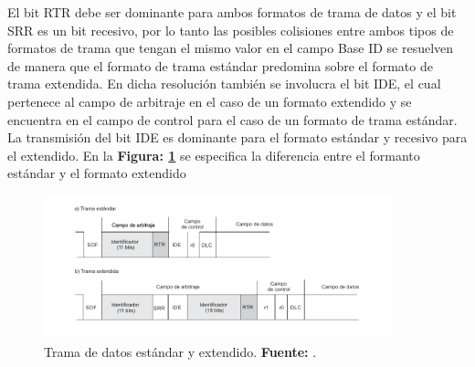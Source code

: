 \begin{itemize}
\begin{itemize}
El bit RTR debe ser dominante para ambos formatos de trama de datos y el bit SRR es un bit recesivo, por lo tanto las posibles colisiones entre ambos tipos de formatos de trama que tengan el mismo valor en el campo Base ID se resuelven de manera que el formato de trama estándar predomina sobre el formato de trama extendida. En dicha resolución también se involucra el bit IDE, el cual pertenece al campo de arbitraje en el caso de un formato extendido y se encuentra en el campo de control para el caso de un formato de trama estándar. La transmisión del bit IDE es dominante para el formato estándar y recesivo para el extendido. En la \textbf{Figura: \ref{FEE}} se especifica la diferencia entre el formanto estándar y el formato extendido

			\begin{figure}[H]
			\centering
				\includegraphics[width=0.9\textwidth]{./Cap2imagen/datos_est_ext.pdf}
			\caption[Trama de datos estándar y extendido.]{Trama de datos estándar y extendido.\textbf{ Fuente:} \cite{PSMR}.}
			\label{FEE} 
			\end{figure}


				
				

\end{itemize}
\end{itemize}
